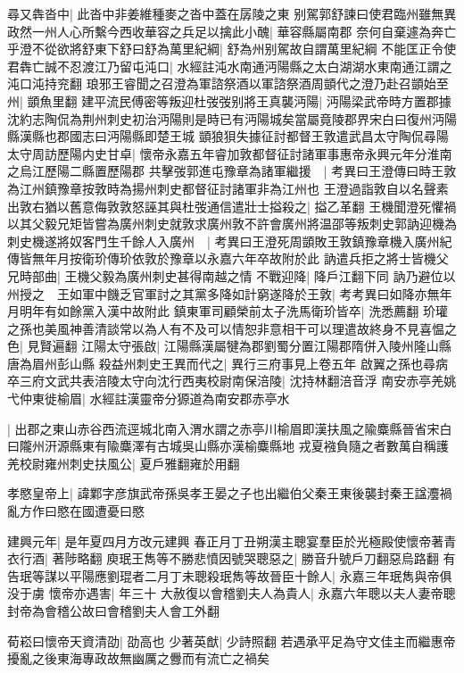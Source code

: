 尋又犇沓中|{
	此沓中非姜維種麥之沓中蓋在孱陵之東}
别駕郭舒諫曰使君臨州雖無異政然一州人心所繫今西收華容之兵足以擒此小醜|{
	華容縣屬南郡}
奈何自棄遽為奔亡乎澄不從欲將舒東下舒曰舒為萬里紀綱|{
	舒為州别駕故自謂萬里紀綱}
不能匡正令使君犇亡誠不忍渡江乃留屯沌口|{
	水經註沌水南通沔陽縣之太白湖湖水東南通江謂之沌口沌持兖翻}
琅邪王睿聞之召澄為軍諮祭酒以軍諮祭酒周顗代之澄乃赴召顗始至州|{
	顗魚里翻}
建平流民傅密等叛迎杜弢弢别將王真襲沔陽|{
	沔陽梁武帝時方置郡據沈約志陶侃為荆州刺史初治沔陽則是時已有沔陽城矣當屬竟陵郡界宋白曰復州沔陽縣漢縣也郡國志曰沔陽縣即楚王城}
顗狼狽失據征討都督王敦遣武昌太守陶侃尋陽太守周訪歷陽内史甘卓|{
	懷帝永嘉五年睿加敦都督征討諸軍事惠帝永興元年分淮南之烏江歷陽二縣置歷陽郡}
共擊弢郭進屯豫章為諸軍繼援　|{
	考異曰王澄傳曰時王敦為江州鎮豫章按敦時為揚州刺史都督征討諸軍非為江州也}
王澄過詣敦自以名聲素出敦右猶以舊意侮敦敦怒誣其與杜弢通信遣壯士搤殺之|{
	搤乙革翻}
王機聞澄死懼禍以其父毅兄矩皆嘗為廣州刺史就敦求廣州敦不許會廣州將温邵等叛刺史郭訥迎機為刺史機遂將奴客門生千餘人入廣州　|{
	考異曰王澄死周顗敗王敦鎮豫章機入廣州紀傳皆無年月按衛玠傳玠依敦於豫章以永嘉六年卒故附於此}
訥遣兵拒之將士皆機父兄時部曲|{
	王機父毅為廣州刺史甚得南越之情}
不戰迎降|{
	降戶江翻下同}
訥乃避位以州授之　王如軍中饑乏官軍討之其黨多降如計窮遂降於王敦|{
	考考異曰如降亦無年月明年有如餘黨入漢中故附此}
鎮東軍司顧榮前太子洗馬衛玠皆卒|{
	洗悉薦翻}
玠瓘之孫也美風神善清談常以為人有不及可以情恕非意相干可以理遣故終身不見喜愠之色|{
	見賢遍翻}
江陽太守張啟|{
	江陽縣漢屬犍為郡劉蜀分置江陽郡隋併入陵州隆山縣唐為眉州彭山縣}
殺益州刺史王異而代之|{
	異行三府事見上卷五年}
啟翼之孫也尋病卒三府文武共表涪陵太守向沈行西夷校尉南保涪陵|{
	沈持林翻涪音浮}
南安赤亭羌姚弋仲東徙榆眉|{
	水經註漢靈帝分獂道為南安郡赤亭水}


|{
	出郡之東山赤谷西流逕城北南入渭水謂之赤亭川榆眉即漢扶風之隃麋縣晉省宋白曰隴州汧源縣東有隃麋澤有古城吳山縣亦漢榆麋縣地}
戎夏襁負隨之者數萬自稱護羌校尉雍州刺史扶風公|{
	夏戶雅翻雍於用翻}


孝愍皇帝上|{
	諱鄴字彦旗武帝孫吳孝王晏之子也出繼伯父秦王東後襲封秦王諡灋禍亂方作曰愍在國遭憂曰愍}


建興元年|{
	是年夏四月方改元建興}
春正月丁丑朔漢主聰宴羣臣於光極殿使懷帝著青衣行酒|{
	著陟略翻}
庾珉王雋等不勝悲憤因號哭聰惡之|{
	勝音升號戶刀翻惡烏路翻}
有告珉等謀以平陽應劉琨者二月丁未聰殺珉雋等故晉臣十餘人|{
	永嘉三年珉雋與帝俱没于虜}
懷帝亦遇害|{
	年三十}
大赦復以會稽劉夫人為貴人|{
	永嘉六年聰以夫人妻帝聰封帝為會稽公故曰會稽劉夫人會工外翻}


荀崧曰懷帝天資清劭|{
	劭高也}
少著英猷|{
	少詩照翻}
若遇承平足為守文佳主而繼惠帝擾亂之後東海專政故無幽厲之釁而有流亡之禍矣

